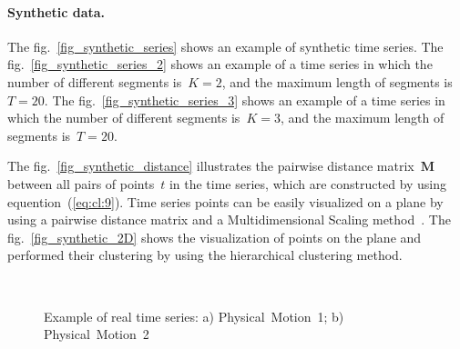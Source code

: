 \documentclass[12pt, twoside]{article}
\numberwithin{equation}{section}
\begin{document}
\paragraph{Synthetic data.}

The fig.~\ref{fig_synthetic_series} shows an example of synthetic time series.
The fig.~\ref{fig_synthetic_series_2} shows an example of a time series in which the number of different segments is~$K = 2$, and the maximum length of segments is~$T = 20$.
The fig.~\ref{fig_synthetic_series_3} shows an example of a time series in which the number of different segments is~$K = 3$, and the maximum length of segments is~$T = 20$.

The fig.~\ref{fig_synthetic_distance} illustrates the pairwise distance matrix~$\textbf{M}$ between all pairs of points~$t$ in the time series, which are constructed by using equention~(\ref{eq:cl:9}).
Time series points can be easily visualized on a plane by using a pairwise distance matrix and a Multidimensional Scaling method~\cite{Borg2005}.
The fig.~\ref{fig_synthetic_2D} shows the visualization of points on the plane and performed their clustering by using the hierarchical clustering method.

\begin{figure}[h!t]\center
{}
\\
\caption{Example of real time series: a) Physical~Motion~1; b) Physical~Motion~2}
\label{fig_real_series}
\end{figure}
\end{document}
